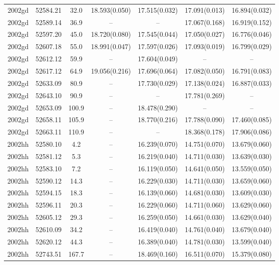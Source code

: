 \begin{table*}
\begin{tabular}{ccccccc}
2002gd	  & 52584.21	 & 32.0	& 18.593(0.050)	 & 17.515(0.032)	 & 17.091(0.013)	 & 16.894(0.032) \\ 
2002gd	  & 52589.14	 & 36.9	& --	 & --	 & 17.067(0.168)	 & 16.919(0.152) \\ 
2002gd	  & 52597.20	 & 45.0	& 18.720(0.080)	 & 17.545(0.044)	 & 17.050(0.027)	 & 16.776(0.046) \\ 
2002gd	  & 52607.18	 & 55.0	& 18.991(0.047)	 & 17.597(0.026)	 & 17.093(0.019)	 & 16.799(0.029) \\ 
2002gd	  & 52612.12	 & 59.9	& --	 & 17.604(0.049)	 & --	 & -- \\ 
2002gd	  & 52617.12	 & 64.9	& 19.056(0.216)	 & 17.696(0.064)	 & 17.082(0.050)	 & 16.791(0.083) \\ 
2002gd	  & 52633.09	 & 80.9	& --	 & 17.730(0.029)	 & 17.138(0.024)	 & 16.887(0.033) \\ 
2002gd	  & 52643.10	 & 90.9	& --	 & --	 & 17.781(0.269)	 & -- \\ 
2002gd	  & 52653.09	 & 100.9	& --	 & 18.478(0.290)	 & --	 & -- \\ 
2002gd	  & 52658.11	 & 105.9	& --	 & 18.770(0.216)	 & 17.788(0.090)	 & 17.460(0.085) \\ 
2002gd	  & 52663.11	 & 110.9	& --	 & --	 & 18.368(0.178)	 & 17.906(0.086) \\ 
2002hh	  & 52580.10	 & 4.2	& --	 & 16.239(0.070)	 & 14.751(0.070)	 & 13.679(0.060) \\ 
2002hh	  & 52581.12	 & 5.3	& --	 & 16.219(0.040)	 & 14.711(0.030)	 & 13.639(0.030) \\ 
2002hh	  & 52583.10	 & 7.2	& --	 & 16.119(0.050)	 & 14.641(0.050)	 & 13.559(0.050) \\ 
2002hh	  & 52590.12	 & 14.3	& --	 & 16.229(0.030)	 & 14.711(0.030)	 & 13.659(0.060) \\ 
2002hh	  & 52594.15	 & 18.3	& --	 & 16.139(0.060)	 & 14.681(0.030)	 & 13.609(0.030) \\ 
2002hh	  & 52596.11	 & 20.3	& --	 & 16.229(0.060)	 & 14.711(0.060)	 & 13.629(0.060) \\ 
2002hh	  & 52605.12	 & 29.3	& --	 & 16.259(0.050)	 & 14.661(0.030)	 & 13.629(0.040) \\ 
2002hh	  & 52610.09	 & 34.2	& --	 & 16.419(0.040)	 & 14.761(0.040)	 & 13.679(0.040) \\ 
2002hh	  & 52620.12	 & 44.3	& --	 & 16.389(0.040)	 & 14.781(0.030)	 & 13.599(0.040) \\ 
2002hh	  & 52743.51	 & 167.7	& --	 & 18.469(0.160)	 & 16.511(0.070)	 & 15.379(0.080) \\ 

\end{tabular}
\end{table*}
